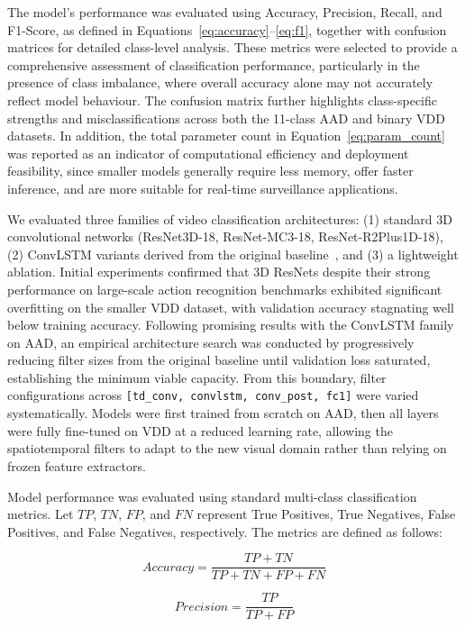 \documentclass[11pt,a4paper]{article}
\begin{document}
	The model's performance was evaluated using Accuracy, Precision, Recall, and F1-Score, as defined in Equations~\eqref{eq:accuracy}--\eqref{eq:f1}, together with confusion matrices for detailed class-level analysis. These metrics were selected to provide a comprehensive assessment of classification performance, particularly in the presence of class imbalance, where overall accuracy alone may not accurately reflect model behaviour. The confusion matrix further highlights class-specific strengths and misclassifications across both the 11-class AAD and binary VDD datasets. In addition, the total parameter count in Equation~\eqref{eq:param_count} was reported as an indicator of computational efficiency and deployment feasibility, since smaller models generally require less memory, offer faster inference, and are more suitable for real-time surveillance applications.

	We evaluated three families of video classification architectures: (1) standard 3D convolutional networks (ResNet3D-18, ResNet-MC3-18, ResNet-R2Plus1D-18), (2) ConvLSTM variants derived from the original baseline~\cite{vrskova2022}, and (3) a lightweight ablation. Initial experiments confirmed that 3D ResNets despite their strong performance on large-scale action recognition benchmarks exhibited significant overfitting on the smaller VDD dataset, with validation accuracy stagnating well below training accuracy. Following promising results with the ConvLSTM family on AAD, an empirical architecture search was conducted by progressively reducing filter sizes from the original baseline until validation loss saturated, establishing the minimum viable capacity. From this boundary, filter configurations across \texttt{[td\_conv, convlstm, conv\_post, fc1]} were varied systematically. Models were first trained from scratch on AAD, then all layers were fully fine-tuned on VDD at a reduced learning rate, allowing the spatiotemporal filters to adapt to the new visual domain rather than relying on frozen feature extractors.

	Model performance was evaluated using standard multi-class classification metrics. Let $TP$, $TN$, $FP$, and $FN$ represent True Positives, True Negatives, False Positives, and False Negatives, respectively. The metrics are defined as follows:

	\begin{equation}
		Accuracy = \frac{TP + TN}{TP + TN + FP + FN}
		\label{eq:accuracy}
	\end{equation}

	\begin{equation}
		Precision = \frac{TP}{TP + FP}
		\label{eq:precision}
	\end{equation}
\end{document}
